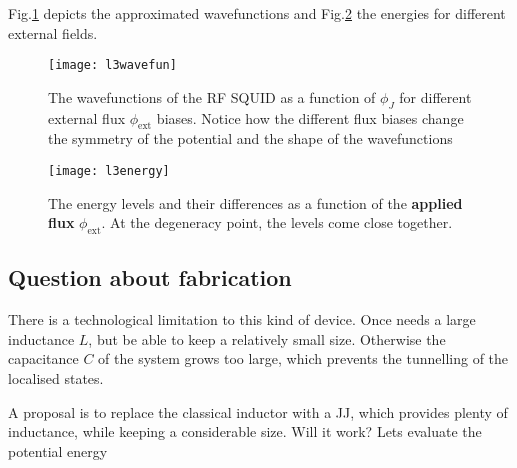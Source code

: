 \noindent    Fig.\ref{fig:l3wavefun}    depicts   the    approximated
wavefunctions and  Fig.\ref{fig:l3energy} the energies  for different
external fields.

\begin{figure}[h]
  \centering \texttt{[image: l3wavefun]}
  \caption{The  wavefunctions  of  the  RF SQUID  as  a  function  of
    $\phi_J$  for different  external flux  $\phi_\text{ext}$ biases.
    Notice how the  different flux biases change the  symmetry of the
    potential and the shape of the wavefunctions}
  \label{fig:l3wavefun}
\end{figure}

\begin{figure}[h]
  \begin{center}
    \texttt{[image: l3energy]}
    \caption{\small  The energy  levels  and their  differences as  a
      function  of the  \textbf{applied flux}  $\phi_\text{ext}$.  At
      the    degeneracy     point,    the    levels     come    close
      together.\label{fig:l3energy}}
  \end{center}
\end{figure}

\newpage

 \subsection{Question about fabrication}
 There is  a technological  limitation to this  kind of  device. Once
 needs a large inductance $L$, but be able to keep a relatively small
 size. Otherwise the capacitance $ C $ of the system grows too large,
 which prevents the tunnelling of the localised states.

 A proposal  is to replace  the classical  inductor with a  JJ, which
 provides plenty  of inductance,  while keeping a  considerable size.
 Will it work?  Lets evaluate the potential energy

